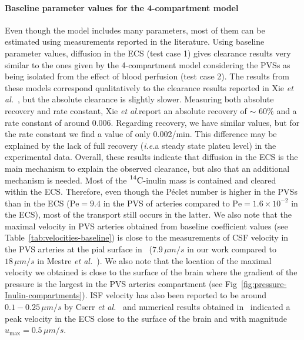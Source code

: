 \documentclass[a4paper,11pt]{article}
\newcommand{\ie}{\emph{i.e.}\;}
\newcommand{\etal}{\emph{et al.}\;}
\newcommand{\1}{^{(1)}}
\newcommand{\2}{^{(2)}}
\newcommand{\Cinulin}{$\prescript{14}{}{\text{C}}$-inulin }
\begin{document}
\paragraph{Baseline parameter values for the 4-compartment model}
Even though the model includes many parameters, most of them can be estimated using measurements reported in the literature. Using baseline parameter values, diffusion in the ECS (test case 1) gives clearance results very similar to the ones given by the 4-compartment model considering the PVSs as being isolated from the effect of blood perfusion (test case 2). The results from these models correspond qualitatively to the clearance results reported in Xie \etal~\cite{Xie_2013_sleep}, but the absolute clearance is slightly slower. Measuring both absolute recovery and rate constant, Xie \etal report an absolute recovery of $\sim$ 60\% and a rate constant of around 0.006. Regarding recovery, we have similar values, but for the rate constant we find a value of only 0.002/min. This difference may be explained by the lack of full recovery (\ie a steady state plateu level) in the experimental data. Overall, these results indicate that %
diffusion in the ECS is the main mechanism to explain the observed clearance, but also that an additional mechanism is needed. Most of the \Cinulin mass is contained and cleared within the ECS. Therefore, even though the P\'eclet number is higher in the PVSs than in the ECS ($\text{Pe}=9.4$ in the PVS of arteries compared to $\text{Pe} = 1.6\times 10^{-2}$ in the ECS), most of the transport still occurs in the latter. We also note that the maximal velocity in PVS arteries obtained from baseline coefficient values (see Table~\ref{tab:velocities-baseline}) is close to the measurements of CSF velocity in the PVS arteries at the pial surface in~\cite{mestre_flow_2018, bedussi-2018-paravascular} ($7.9 \, \si{\mu m/s}$ in our work compared to $18 \,\si{\mu m/s}$ in Mestre \etal~\cite{mestre_flow_2018}). We also note that the location of the maximal velocity we obtained is close to the surface of the brain where the gradient of the pressure is the largest in the PVS arteries compartment (see Fig~\ref{fig:pressure-Inulin-compartments}).
ISF velocity has also been reported to be around $0.1-0.25 \,\si{\mu m/s}$ by Cserr \etal~\cite{cserr1977flow,cserr1981efflux} and numerical results obtained in~\cite{piersanti2022brain} indicated a peak velocity in the ECS close to the surface of the brain and with magnitude $u_{\max} = 0.5\,\si{\mu m/s}$. 
\end{document}
